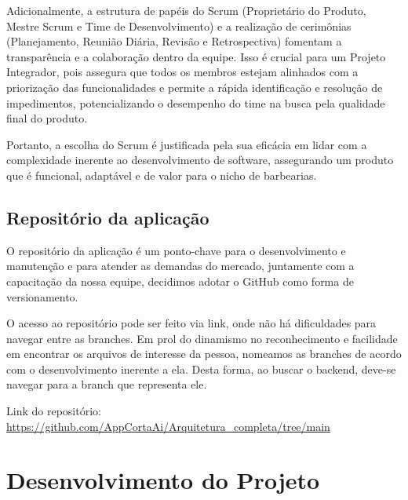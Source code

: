 \documentclass[
    12pt, 
    a4paper, 
    oneside, 
    chapter=TITLE, 
    section=TITLE
]{abntex2}
\begin{document}
Adicionalmente, a estrutura de papéis do Scrum (Proprietário do Produto, Mestre Scrum e Time de Desenvolvimento) e a realização de cerimônias (Planejamento, Reunião Diária, Revisão e Retrospectiva) fomentam a transparência e a colaboração dentro da equipe. Isso é crucial para um Projeto Integrador, pois assegura que todos os membros estejam alinhados com a priorização das funcionalidades e permite a rápida identificação e resolução de impedimentos, potencializando o desempenho do time na busca pela qualidade final do produto.

Portanto, a escolha do Scrum é justificada pela sua eficácia em lidar com a complexidade inerente ao desenvolvimento de software, assegurando um produto que é funcional, adaptável e de valor para o nicho de barbearias.

\section{Repositório da aplicação}
O repositório da aplicação é um ponto-chave para o desenvolvimento e manutenção e para atender as demandas do mercado, juntamente com a capacitação da nossa equipe, decidimos adotar o GitHub como forma de versionamento.

O acesso ao repositório pode ser feito via link, onde não há dificuldades para navegar entre as branches. Em prol do dinamismo no reconhecimento e facilidade em encontrar os arquivos de interesse da pessoa, nomeamos as branches de acordo com o desenvolvimento inerente a ela. Desta forma, ao buscar o backend, deve-se navegar para a branch que representa ele.

Link do repositório: 
\url{https://github.com/AppCortaAi/Arquitetura_completa/tree/main}

\chapter{Desenvolvimento do Projeto}
\end{document}
